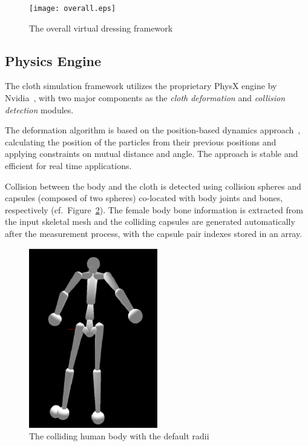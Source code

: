 \documentclass[number,preprint,review,12pt]{elsarticle}
\begin{document}
\begin{figure}[htbp]
	\centerline{
	\texttt{[image: overall.eps]}
	}
	\caption{The overall virtual dressing framework}
	\label{fig:overall}
\end{figure}

\subsection{Physics Engine}
\label{subsec:Physics}
The cloth simulation framework utilizes the proprietary PhysX engine by Nvidia~\cite{Kim2011}, with two major components as the {\em cloth deformation} and {\em collision detection} modules. 

The deformation algorithm is based on the position-based dynamics approach~\cite{Mullera2007}, calculating the position of the particles from their previous positions and applying constraints on mutual distance and angle. The approach is stable and efficient for real time applications. 

Collision between the body and the cloth is detected using collision spheres and capsules (composed of two spheres) co-located with body joints and bones, respectively (cf.~Figure~\ref{fig:colliders}). The female body bone information is extracted from the input skeletal mesh and the colliding capsules are generated automatically after the measurement process, with the capsule pair indexes stored in an array.

\begin{figure}[htbp]
	\begin{center}
	\includegraphics[width=0.5\textwidth]{colliders.eps}
	\end{center}
	\caption{The colliding human body with the default radii}
	\label{fig:colliders}
\end{figure}
\end{document}
